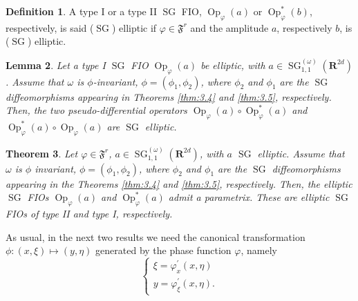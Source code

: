 \documentclass[12pt,a4paper,reqno]{amsart}
\numberwithin{equation}{section}
\newtheorem{thm}{Theorem}
\numberwithin{thm}{section}
\newtheorem{lemma}[thm]{Lemma}
\theoremstyle{definition}
\newtheorem{defn}[thm]{Definition}
\theoremstyle{remark}
\begin{document}
\begin{defn}
\label{def:3.1}
A type I  or a type II ${\operatorname{SG}}$ FIO, ${\operatorname{Op}}_{\varphi}(a)$ or ${\operatorname{Op}}^*_{\varphi}(b)$, respectively,
is said (${\operatorname{SG}}$) elliptic if $\varphi \in {\mathfrak{F}^r}$ and the amplitude $a$, respectively $b$, is (${\operatorname{SG}}$) elliptic. 
\end{defn}
\begin{lemma}
\label{lemma:3.15}
Let a type I ${\operatorname{SG}}$ FIO ${\operatorname{Op}}_{\varphi}(a)$ be elliptic, with 
$a\in{\operatorname{SG}}^{(\omega)}_{1,1}({\mathbf R^{{2d}}})$. Assume that $\omega$ is $\phi$-invariant, 
$\phi=(\phi_1,\phi_2)$, where $\phi_2$ and $\phi_1$ are the ${\operatorname{SG}}$ diffeomorphisms
appearing in Theorems \ref{thm:3.4} and \ref{thm:3.5}, respectively.
Then, the two pseudo-differential operators ${\operatorname{Op}}_{\varphi}(a)\circ{\operatorname{Op}}^*_{\varphi}(a)$ and ${\operatorname{Op}}
^*_{\varphi}(a)\circ{\operatorname{Op}}_{\varphi}(a)$ are ${\operatorname{SG}}$ elliptic.
\end{lemma}

\par

\begin{thm}
\label{thm:3.8}
Let $\varphi \in {\mathfrak{F}^r}$, $a\in {\operatorname{SG}} ^{(\omega)}_{1,1}({\mathbf R^{{2d}}})$, with $a$ ${\operatorname{SG}}$ elliptic.
Assume that $\omega$ is $\phi$ invariant, 
$\phi=(\phi_1,\phi_2)$, where $\phi_2$ and $\phi_1$ are the ${\operatorname{SG}}$ diffeomorphisms
appearing in the Theorems \ref{thm:3.4} and \ref{thm:3.5}, respectively.
Then, the elliptic ${\operatorname{SG}}$ FIOs ${\operatorname{Op}}_{\varphi}(a)$ and ${\operatorname{Op}}^*_{\varphi}(a)$ admit a parametrix.
These are elliptic ${\operatorname{SG}}$ FIOs of type II and type I, respectively.
\end{thm}

\noindent
As usual, in the next two results we need
the canonical transformation $\phi\colon(x,\xi)\mapsto(y,\eta)$ generated by
the phase function $\varphi$, namely
\begin{equation}\label{eq:phi}
	\begin{cases}
		\xi=\varphi^\prime_x(x,\eta)
		\\
		y=\varphi^\prime_\xi(x,\eta).
	\end{cases}
\end{equation}
\end{document}
